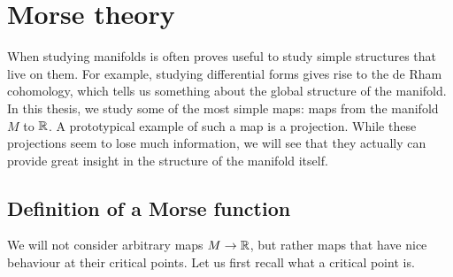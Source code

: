 \chapter{Morse theory}

When studying manifolds is often proves useful to study simple structures that live on them. For example, studying differential forms gives rise to the de Rham cohomology, which tells us something about the global structure of the manifold. In this thesis, we study some of the most simple maps: maps from the manifold $M$ to $\mathbb{R}$. A prototypical example of such a map is a projection.
While these projections seem to lose much information, we will see that they actually can provide great insight in the structure of the manifold itself.

\section{Definition of a Morse function}

We will not consider arbitrary maps $M \to \mathbb{R}$, but rather maps that have nice behaviour at their critical points. Let us first recall what a critical point is.

